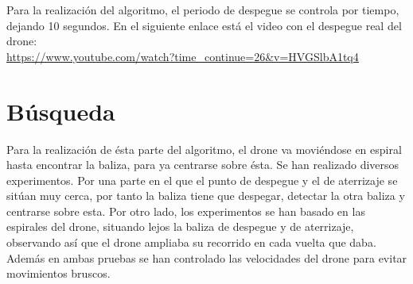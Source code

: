 Para la realizaci\'on del algoritmo, el periodo de despegue se controla por tiempo, dejando 10 segundos. 
En el siguiente enlace est\'a el video con el despegue real del drone:\\
\underline{\url{https://www.youtube.com/watch?time_continue=26&v=HVGSlbA1tq4}}

\section{B\'usqueda }

\hspace{1cm} Para la realizaci\'on de \'esta parte del algoritmo, el drone va movi\'endose en espiral hasta encontrar la baliza, para ya centrarse sobre \'esta. Se han realizado diversos experimentos. Por una parte en el que el punto de despegue y el de aterrizaje se sit\'uan muy cerca, por tanto la baliza tiene que despegar, detectar la otra baliza y centrarse sobre esta. Por otro lado, los experimentos se han basado en las espirales del drone, situando lejos la baliza de despegue y de aterrizaje, observando as\'i que el drone ampliaba su recorrido en cada vuelta que daba. Adem\'as en ambas pruebas se han controlado las velocidades del drone para evitar movimientos bruscos. 


